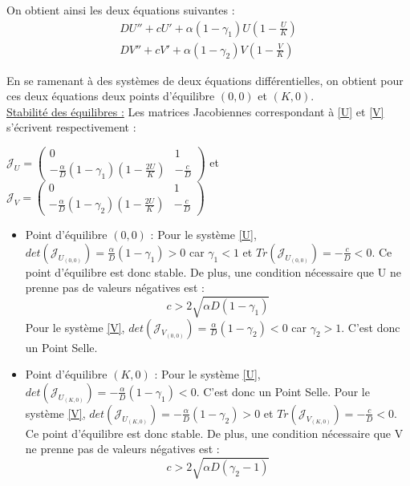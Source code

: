 \documentclass[a4paper,11pt]{article}
\begin{document}
\noindent On obtient ainsi les deux équations suivantes :
\begin{eqnarray}
\label{U} DU'' + cU' + \alpha(1-\gamma_1)U\left(1-\frac{U}{K}\right)\\
\label{V} DV'' + cV' + \alpha(1-\gamma_2)V\left(1-\frac{V}{K}\right)
\end{eqnarray}

\noindent En se ramenant à des systèmes de deux équations différentielles, on obtient pour ces deux équations deux points d'équilibre $(0,0)$ et $(K,0)$.\\

\noindent \underline{Stabilité des équilibres :}
\newline
Les matrices Jacobiennes correspondant à \eqref{U} et \eqref{V} s'écrivent respectivement :
\begin{center}$\mathcal{J}_U = \begin{pmatrix} 0 & 1 \\ -\frac{\alpha}{D}(1-\gamma_1)\left(1-\frac{2U}{K}\right) & -\frac{c}{D} \end{pmatrix}$ et $\mathcal{J}_V = \begin{pmatrix} 0 & 1 \\ -\frac{\alpha}{D}(1-\gamma_2)\left(1-\frac{2U}{K}\right) & -\frac{c}{D} \end{pmatrix}$\\

\end{center}

\begin{itemize}[label=$\bullet$]
\item Point d'équilibre $(0,0)$ :
\newline
Pour le système \eqref{U}, $det(\mathcal{J}_{U_{(0,0)}}) = \frac{\alpha}{D}(1-\gamma_1) > 0$ car $\gamma_1 < 1$ et $Tr(\mathcal{J}_{U_{(0,0)}}) = -\frac{c}{D} < 0$. Ce point d'équilibre est donc stable. De plus, une condition nécessaire que U ne prenne pas de valeurs négatives est : $$ c > 2\sqrt{\alpha D(1-\gamma_1)} $$
\newline
Pour le système \eqref{V}, $det(\mathcal{J}_{V_{(0,0)}}) = \frac{\alpha}{D}(1-\gamma_2) < 0$ car $\gamma_2 > 1$. C'est donc un Point Selle.\\

\item Point d'équilibre $(K,0)$ :
\newline
Pour le système \eqref{U}, $det(\mathcal{J}_{U_{(K,0)}}) = -\frac{\alpha}{D}(1-\gamma_1) < 0$. C'est donc un Point Selle.
\newline
Pour le système \eqref{V}, $det(\mathcal{J}_{U_{(K,0)}}) = -\frac{\alpha}{D}(1-\gamma_2) > 0$ et $Tr(\mathcal{J}_{V_{(K,0)}}) = -\frac{c}{D} < 0$. Ce point d'équilibre est donc stable. De plus, une condition nécessaire que V ne prenne pas de valeurs négatives est : $$ c > 2\sqrt{\alpha D(\gamma_2 - 1)}$$
\end{itemize}
\end{document}

